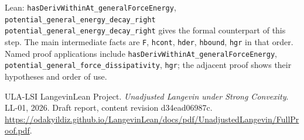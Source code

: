 \documentclass[11pt,a4paper]{article}
\begin{document}
\begin{leanbox}{Lean: \texttt{hasDerivWithinAt\_\allowbreak{}generalForceEnergy}, \texttt{potential\_\allowbreak{}general\_\allowbreak{}energy\_\allowbreak{}decay\_\allowbreak{}right}}
\texttt{potential\_\allowbreak{}general\_\allowbreak{}energy\_\allowbreak{}decay\_\allowbreak{}right} gives the formal counterpart of this step. The main intermediate facts are \texttt{F}, \texttt{hcont}, \texttt{hder}, \texttt{hbound}, \texttt{hgr} in that order. Named proof applications include \texttt{has\allowbreak{}Deriv\allowbreak{}Within\allowbreak{}At\_\allowbreak{}general\allowbreak{}Force\allowbreak{}Energy}, \texttt{potential\_\allowbreak{}general\_\allowbreak{}force\_\allowbreak{}dissipativity}, \texttt{hgr}; the adjacent proof shows their hypotheses and order of use.
\end{leanbox}

\begin{thebibliography}{ULA-LSI}
LangevinLean Project. \emph{Unadjusted Langevin under Strong Convexity}. LL-01, 2026. Draft report, content revision d34ead06987c. \url{https://odakyildiz.github.io/LangevinLean/docs/pdf/UnadjustedLangevin/FullProof.pdf}.
\end{thebibliography}
\end{document}
